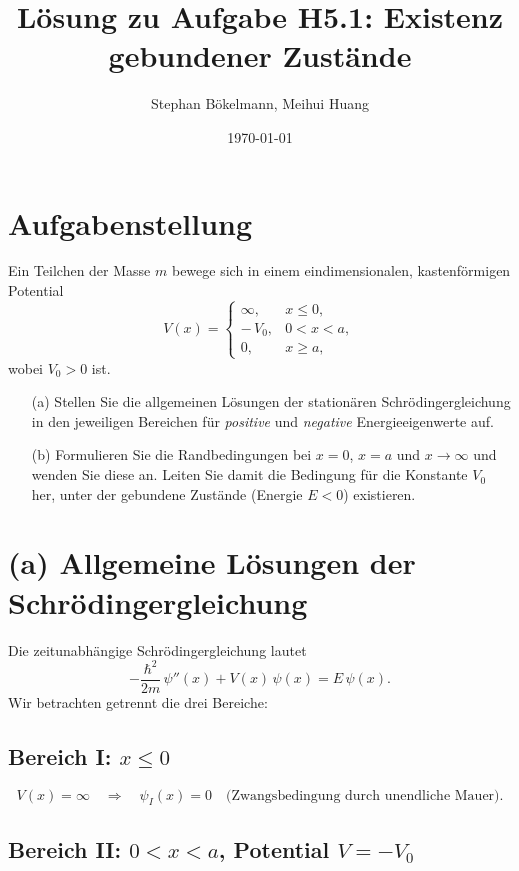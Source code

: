 \documentclass[a4paper,12pt]{article}
\begin{document}
\title{Lösung zu Aufgabe H5.1: Existenz gebundener Zustände}
\author{Stephan Bökelmann, Meihui Huang}
\date{\today}
\maketitle

\section*{Aufgabenstellung}
Ein Teilchen der Masse $m$ bewege sich in einem eindimensionalen, kastenförmigen Potential
\[
V(x)=
\begin{cases}
\infty,& x\le0,\\
-\,V_0,& 0<x<a,\\
0,& x\ge a,
\end{cases}
\]
wobei $V_0>0$ ist.

\begin{enumerate}
  \item[(a)] Stellen Sie die allgemeinen Lösungen der stationären Schrödingergleichung in den
    jeweiligen Bereichen für \emph{positive} und \emph{negative} Energieeigenwerte auf.
  \item[(b)] Formulieren Sie die Randbedingungen bei $x=0$, $x=a$ und $x\to\infty$ und wenden Sie
    diese an. Leiten Sie damit die Bedingung für die Konstante $V_0$ her, unter der gebundene
    Zustände (Energie $E<0$) existieren.
\end{enumerate}

\section{(a) Allgemeine Lösungen der Schrödingergleichung}

Die zeitunabhängige Schrödingergleichung lautet
\[
-\frac{\hbar^2}{2m}\,\psi''(x) + V(x)\,\psi(x) = E\,\psi(x).
\]
Wir betrachten getrennt die drei Bereiche:

\subsection*{Bereich I: \boldmath $x\le0$}
\[
V(x)=\infty \quad\Longrightarrow\quad \psi_I(x)=0
\quad\text{(Zwangsbedingung durch unendliche Mauer).}
\]

\subsection*{Bereich II: \boldmath $0<x<a$, Potential $V=-V_0$}
\end{document}
